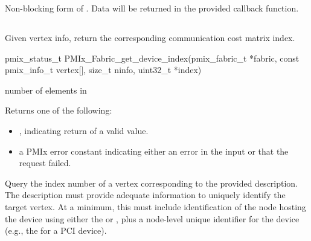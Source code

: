 \descr

Non-blocking form of . Data will be returned in the provided callback function.


\subsection{}

\summary

Given vertex info, return the corresponding communication cost matrix index.

\format

\cspecificstart
\begin{codepar}
pmix_status_t
PMIx_Fabric_get_device_index(pmix_fabric_t *fabric,
                      const pmix_info_t vertex[], size_t ninfo,
                      uint32_t *index)
\end{codepar}
\cspecificend

\begin{arglist}
 number of elements in 
\end{arglist}

Returns one of the following:

\begin{itemize}
    \item {}, indicating return of a valid value.
    \item a \ac{PMIx} error constant indicating either an error in the input or that the request failed.
\end{itemize}


\descr

Query the index number of a vertex corresponding to the provided description. The description must provide adequate information to uniquely identify the target vertex. At a minimum, this must include identification of the node hosting the device using either the  or , plus a node-level unique identifier for the device (e.g., the  for a \ac{PCI} device).


